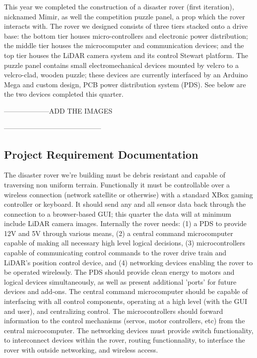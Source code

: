 \documentclass[a4paper, 10pt]{article}
\begin{document}
	This year we completed the construction of a disaster rover (first iteration), nicknamed Mimir, as well the competition puzzle panel, a prop which the rover interacts with. The rover we designed consists of three tiers stacked onto a drive base: the bottom tier houses micro-controllers and electronic power distribution; the middle tier houses the microcomputer and communication devices; and the top tier houses the LiDAR camera system and its control Stewart platform. The puzzle panel contains small electromechanical devices mounted by velcro to a velcro-clad, wooden puzzle; these devices are currently interfaced by an Arduino Mega and custom design, PCB power distribution system (PDS). See below are the two devices completed this quarter.

	--------------------ADD THE IMAGES
	
	------------------------------------------
	
\pagebreak

	\subsection*{Project Requirement Documentation}
	The disaster rover we're building must be debris resistant and capable of traversing non uniform terrain. Functionally it must be controllable over a wireless connection (network satellite or otherwise) with a standard XBox gaming controller or keyboard. It should send any and all sensor data back through the connection to a browser-based GUI; this quarter the data will at minimum include LiDAR camera images. Internally the rover needs: (1) a PDS to provide 12V and 5V through various means, (2) a central command microcomputer capable of making all necessary high level logical decisions, (3) microcontrollers capable of communicating control commands to the rover drive train and LiDAR's position control device, and (4) networking devices enabling the rover to be operated wirelessly. The PDS should provide clean energy to motors and logical devices simultaneously, as well as present additional 'ports' for future devices and add-ons. The central command microcomputer should be capable of interfacing with all control components, operating at a high level (with the GUI and user), and centralizing control. The microcontrollers should forward information to the control mechanisms (servos, motor controllers, etc) from the central microcomputer. The networking devices must provide switch functionality, to interconnect devices within the rover, routing functionnality, to interface the rover with outside networking, and wireless access.
	
\end{document}

